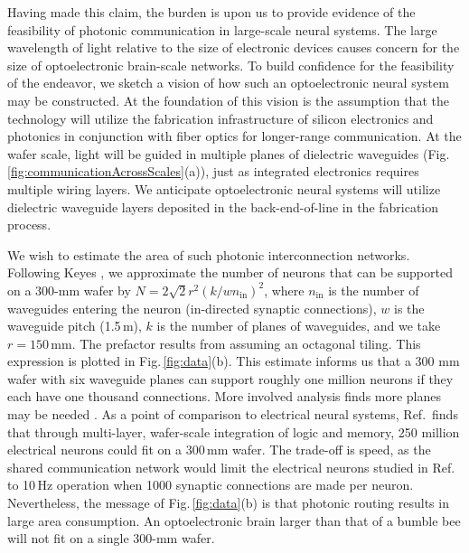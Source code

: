 \documentclass[twocolumn]{article}
\newcommand{\onlinecite}[1]{\hspace{-1 ex} \nocite{#1}\citenum{#1}}
\begin{document}
Having made this claim, the burden is upon us to provide evidence of the feasibility of photonic communication in large-scale neural systems. The large wavelength of light relative to the size of electronic devices causes concern for the size of optoelectronic brain-scale networks. To build confidence for the feasibility of the endeavor, we sketch a vision of how such an optoelectronic neural system may be constructed. At the foundation of this vision is the assumption that the technology will utilize the fabrication infrastructure of silicon electronics and photonics in conjunction with fiber optics for longer-range communication. At the wafer scale, light will be guided in multiple planes of dielectric waveguides \cite{chbu2017,chbu2018} (Fig.\,\ref{fig:communicationAcrossScales}(a)), just as integrated electronics requires multiple wiring layers.  We anticipate optoelectronic neural systems will utilize dielectric waveguide layers deposited in the back-end-of-line in the fabrication process.

We wish to estimate the area of such photonic interconnection networks. Following Keyes \cite{ke1982}, we approximate the number of neurons that can be supported on a 300-mm wafer by $N = 2\sqrt{2}r^2\left(k/wn_{\mathrm{in}}\right)^2$, where $n_{\mathrm{in}}$ is the number of waveguides entering the neuron (in-directed synaptic connections), $w$ is the waveguide pitch (1.5\,\textmu m), $k$ is the number of planes of waveguides, and we take $r = 150$\,mm. The prefactor results from assuming an octagonal tiling. This expression is plotted in Fig.\,\ref{fig:data}(b). This estimate informs us that a 300 mm wafer with six waveguide planes can support roughly one million neurons if they each have one thousand connections. More involved analysis finds more planes may be needed \cite{sh2018_ICRC}. As a point of comparison to electrical neural systems, Ref.\,\onlinecite{kuwa2017} finds that through multi-layer, wafer-scale integration of logic and memory, 250 million electrical neurons could fit on a 300\,mm wafer. The trade-off is speed, as the shared communication network would limit the electrical neurons studied in Ref.\,\onlinecite{kuwa2017} to 10\,Hz operation when 1000 synaptic connections are made per neuron. Nevertheless, the message of Fig.\,\ref{fig:data}(b) is that photonic routing results in large area consumption. An optoelectronic brain larger than that of a bumble bee will not fit on a single 300-mm wafer.
\end{document}
